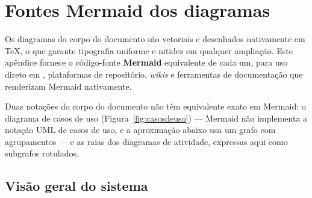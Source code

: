 \chapter{Fontes Mermaid dos diagramas}
\label{ap:mermaid}

Os diagramas do corpo do documento são vetoriais e desenhados nativamente em
\TeX{}, o que garante tipografia uniforme e nitidez em qualquer ampliação. Este
apêndice fornece o código-fonte \textbf{Mermaid} equivalente de cada um, para uso
direto em , plataformas de repositório, \textit{wikis} e
ferramentas de documentação que renderizam Mermaid nativamente.

\begin{nota}
Duas notações do corpo do documento não têm equivalente exato em Mermaid: o
diagrama de casos de uso (Figura~\ref{fig:casosdeuso}) --- Mermaid não implementa
a notação UML de casos de uso, e a aproximação abaixo usa um grafo com
agrupamentos --- e as raias dos diagramas de atividade, expressas aqui como
subgrafos rotulados.
\end{nota}

\section{Visão geral do sistema}

